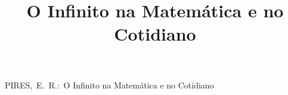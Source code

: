 \documentclass[journal,transmag]{IEEEtran}
\begin{document}
%
\title{O Infinito na Matemática e no Cotidiano}




\author{}



%
{PIRES,~E.~R.:~O Infinito na Matemática e no Cotidiano}
% 







\end{document}
